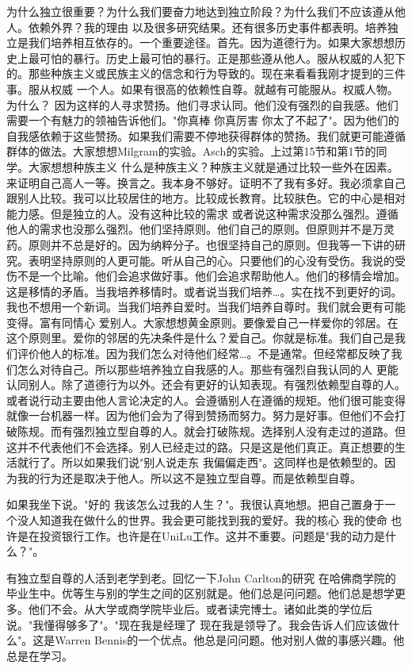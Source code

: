 为什么独立很重要？为什么我们要奋力地达到独立阶段？为什么我们不应该遵从他人。依赖外界？我的理由 以及很多研究结果。还有很多历史事件都表明。培养独立是我们培养相互依存的。一个重要途径。首先。因为道德行为。如果大家想想历史上最可怕的暴行。历史上最可怕的暴行。正是那些遵从他人。服从权威的人犯下的。那些种族主义或民族主义的信念和行为导致的。现在来看看我刚才提到的三件事。服从权威 一个人。如果有很高的依赖性自尊。就越有可能服从。权威人物。为什么？ 因为这样的人寻求赞扬。他们寻求认同。他们没有强烈的自我感。他们需要一个有魅力的领袖告诉他们。"你真棒 你真厉害 你太了不起了"。因为他们的自我感依赖于这些赞扬。如果我们需要不停地获得群体的赞扬。我们就更可能遵循群体的做法。大家想想Milgram的实验。Asch的实验。上过第15节和第1节的同学。大家想想种族主义 什么是种族主义？种族主义就是通过比较一些外在因素。来证明自己高人一等。换言之。我本身不够好。证明不了我有多好。我必须拿自己跟别人比较。我可以比较居住的地方。比较成长教育。比较肤色。它的中心是相对能力感。但是独立的人。没有这种比较的需求 或者说这种需求没那么强烈。遵循他人的需求也没那么强烈。他们坚持原则。他们自己的原则。但原则并不是万灵药。原则并不总是好的。因为纳粹分子。也很坚持自己的原则。但我等一下讲的研究。表明坚持原则的人更可能。听从自己的心。只要他们的心没有受伤。我说的受伤不是一个比喻。他们会追求做好事。他们会追求帮助他人。他们的移情会增加。这是移情的矛盾。当我培养移情时。或者说当我们培养…。实在找不到更好的词。我也不想用一个新词。当我们培养自爱时。当我们培养自尊时。我们就会更有可能变得。富有同情心 爱别人。大家想想黄金原则。要像爱自己一样爱你的邻居。在这个原则里。爱你的邻居的先决条件是什么？爱自己。你就是标准。我们自己是我们评价他人的标准。因为我们怎么对待他们经常…。不是通常。但经常都反映了我们怎么对待自己。所以那些培养独立自我感的人。那些有强烈自我认同的人 更能认同别人。除了道德行为以外。还会有更好的认知表现。有强烈依赖型自尊的人。或者说行动主要由他人言论决定的人。会遵循别人在遵循的规矩。他们很可能变得就像一台机器一样。因为他们会为了得到赞扬而努力。努力是好事。但他们不会打破陈规。而有强烈独立型自尊的人。就会打破陈规。选择别人没有走过的道路。但这并不代表他们不会选择。别人已经走过的路。只是这是他们真正。真正想要的生活就行了。所以如果我们说"别人说走东 我偏偏走西"。这同样也是依赖型的。因为我的行为还是取决于他人。所以这不是独立型自尊。而是依赖型自尊。 

如果我坐下说。"好的 我该怎么过我的人生？"。我很认真地想。把自己置身于一个没人知道我在做什么的世界。我会更可能找到我的爱好。我的核心 我的使命 也许是在投资银行工作。也许是在UniLu工作。这并不重要。问题是"我的动力是什么？"。 

有独立型自尊的人活到老学到老。回忆一下John Carlton的研究 在哈佛商学院的毕业生中。优等生与别的学生之间的区别就是。他们总是问问题。他们总是想学更多。他们不会。从大学或商学院毕业后。或者读完博士。诸如此类的学位后 说。"我懂得够多了"。"现在我是经理了 现在我是领导了。我会告诉人们应该做什么"。这是Warren Bennis的一个优点。他总是问问题。他对别人做的事感兴趣。他总是在学习。 

